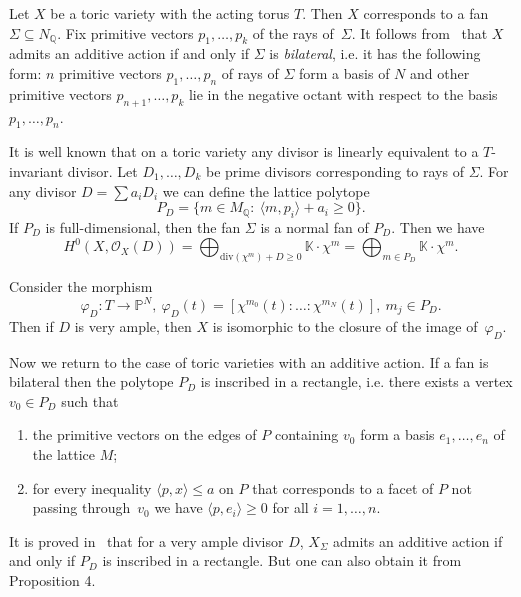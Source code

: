 \documentclass[a4paper,draft,reqno,12pt]{amsart}
\theoremstyle{definition}
\theoremstyle{definition}
\theoremstyle{remark}
\def\BK{{\mathbb K}}
\def\BK{{\mathbb K}}
\def\BQ{{\mathbb Q}}
\def\BP{{\mathbb P}}
\def\CO{\mathcal{O}}
\def\div{\mathrm{div}}
\begin{document}
Let $X$ be a toric variety with the acting torus $T$. Then $X$ corresponds to a fan~$\Sigma\subseteq N_\BQ$. Fix primitive vectors $p_1,\dotsc,p_k$ of the rays of~$\Sigma$. It follows from~\cite[Theorem 3.4]{AR} that $X$ admits an additive action if and only if $\Sigma$ is \emph{bilateral}, i.e. it has the following form: $n$ primitive vectors $p_1, \dotsc,p_n$ of rays of $\Sigma$ form a basis of $N$ and other primitive vectors $p_{n+1},\dotsc,p_k$ lie in the negative octant with respect to the basis~$p_1,\dotsc,p_n$.


It is well known that on a toric variety any divisor is linearly equivalent to a $T$-invariant divisor. Let $D_1,\dotsc,D_k$ be prime divisors corresponding to rays of $\Sigma$. For any divisor $D=\sum a_iD_i$ we can define the lattice polytope \begin{equation*}
    P_D= \{m\in M_\BQ: \ \langle m,p_i\rangle + a_i \geq0\}.
\end{equation*} If $P_D$ is full-dimensional, then the fan $\Sigma$ is a normal fan of $P_D$. Then we have \begin{equation*}
    H^0(X,\CO_X(D)) = \bigoplus_{\div(\chi^m)+D\geq0}\BK\cdot\chi^m = \bigoplus_{m\in P_D}\BK\cdot\chi^m.
\end{equation*}

Consider the morphism \begin{equation*}
    \varphi_D:T\to\BP^{N}, \ \varphi_D(t)=[\chi^{m_0}(t):\dotsc:\chi^{m_N}(t)], \ m_j\in P_D.
\end{equation*} Then if $D$ is very ample, then $X$ is isomorphic to the closure of the image of~$\varphi_D$.

Now we return to the case of toric varieties with an additive action. If a fan is bilateral then the polytope $P_D$ is inscribed in a rectangle, i.e. there exists a vertex $v_0\in P_D$ such that \begin{enumerate}
    \item the primitive vectors on the edges of $P$ containing $v_0$ form a basis $e_1,\dotsc,e_n$ of the lattice $M$;
    \item for every inequality $\langle p,x\rangle\leq a$ on $P$ that corresponds to a facet of $P$ not passing through~$v_0$ we have $\langle p,e_i\rangle \geq 0$ for all $i=1,\dotsc,n$.
\end{enumerate}

It is proved in~\cite{AR} that for a very ample divisor $D$, $X_\Sigma$ admits an additive action if and only if $P_D$ is inscribed in a rectangle. But one can also obtain it from Proposition 4.
\end{document}
